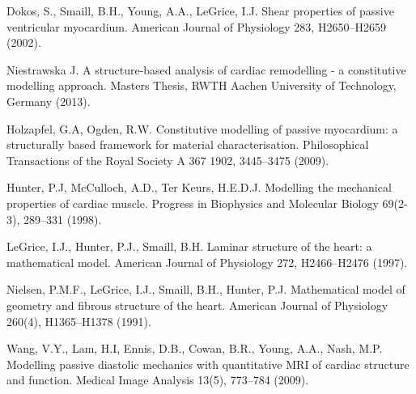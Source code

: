 \documentclass{llncs}
\begin{document}
\begin{thebibliography}{1}
	
	Dokos, S., Smaill, B.H., Young, A.A., LeGrice, I.J.
	Shear properties of passive ventricular myocardium.
	American Journal of Physiology 283, H2650--H2659 (2002).
	
	Niestrawska J.
	A structure-based analysis of cardiac remodelling - a constitutive modelling approach.
	Masters Thesis, RWTH Aachen University of Technology, Germany (2013).
	
	Holzapfel, G.A, Ogden, R.W.
	Constitutive modelling of passive myocardium: a structurally based framework for material characterisation. 
	Philosophical Transactions of the Royal Society A 367 1902, 3445--3475 (2009).
	
	Hunter, P.J, McCulloch, A.D., Ter Keurs, H.E.D.J.
	Modelling the mechanical properties of cardiac muscle.
	Progress in Biophysics and Molecular Biology 69(2-3), 289--331 (1998).

	LeGrice, I.J., Hunter, P.J., Smaill, B.H.
	Laminar structure of the heart: a mathematical model.
	American Journal of Physiology 272, H2466--H2476 (1997).
	
	Nielsen, P.M.F., LeGrice, I.J., Smaill, B.H., Hunter, P.J.
	Mathematical model of geometry and fibrous structure of the heart.
	American Journal of Physiology 260(4), H1365--H1378 (1991).
	
	Wang, V.Y., Lam, H.I, Ennis, D.B., Cowan, B.R., Young, A.A., Nash, M.P.
	Modelling passive diastolic mechanics with quantitative MRI of cardiac structure and function. 
	Medical Image Analysis 13(5), 773--784 (2009).
 
\end{thebibliography}
\end{document}
